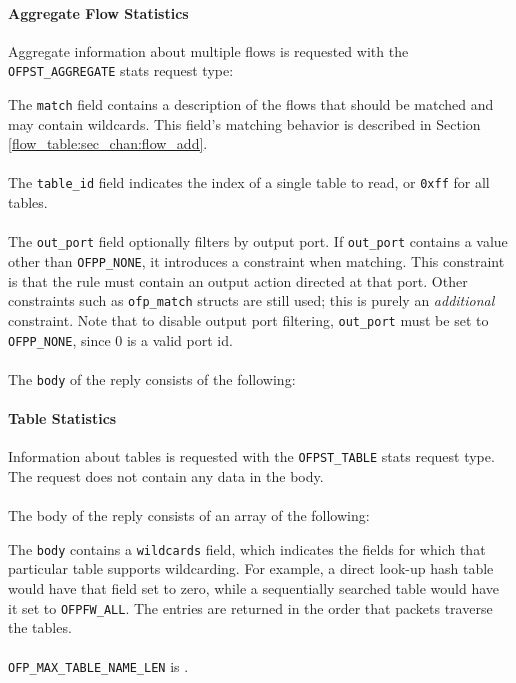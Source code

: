 \paragraph{Aggregate Flow Statistics}
Aggregate information about multiple flows is requested with the \verb|OFPST_AGGREGATE| stats request type:


The \verb|match| field contains a description of the flows that should be matched and may contain wildcards.  This field's matching behavior is described in Section \ref{flow_table:sec_chan:flow_add}.
\\\\
The \verb|table_id| field indicates the index of a single table to read, or \verb|0xff| for all tables.
\\\\
The \verb|out_port| field optionally filters by output port.  If \verb|out_port| contains a value other than \verb|OFPP_NONE|, it introduces a constraint when matching.  This constraint is that the rule must contain an output action directed at that port.  Other constraints such as \verb|ofp_match| structs are still used; this is purely an \emph{additional} constraint.  Note that to disable output port filtering, \verb|out_port| must be set to \verb|OFPP_NONE|, since 0 is a valid port id. 
\\\\
The \verb|body| of the reply consists of the following:

 

\paragraph{Table Statistics}
Information about tables is requested with the \verb|OFPST_TABLE| stats request type.  The request does not contain any data in the body.
\\\\
The body of the reply consists of an array of the following:


The \verb|body| contains a \verb|wildcards| field, which indicates the fields for which that particular table supports wildcarding. For example, a direct look-up hash table would have that field set to zero, while a sequentially searched table would have it set to \verb|OFPFW_ALL|. The entries are returned in the order that packets traverse the tables. 
\\\\
\verb|OFP_MAX_TABLE_NAME_LEN| is .

